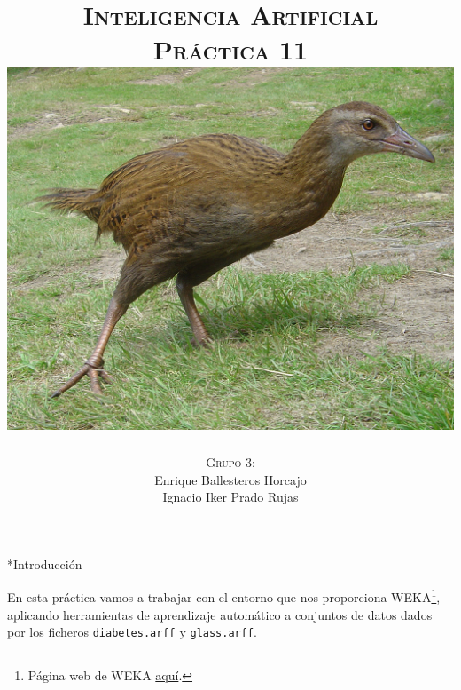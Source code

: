 \documentclass[11pt, a4paper, spanish, openright, twoside]{book}
\begin{document}
 
\title{\Huge{\textsc{Inteligencia Artificial}} \\
	\vspace{0.7cm}
	 \textsc{\Large{Práctica 11}} \\
	\vspace{1.5cm}
	\includegraphics[scale=0.2]{weka}
	}
\author{\textsc{Grupo 3:}\\
	Enrique Ballesteros Horcajo\\
	Ignacio Iker Prado Rujas}
\date{\Today}
\maketitle

\newpage
\mbox{}
\thispagestyle{empty}						%
\newpage


\tableofcontents 							%

\newpage
\mbox{}
\thispagestyle{empty}						%
\newpage


\vspace{3cm}


\newpage

\begin{section}*{Introducción}
	
	En esta práctica vamos a trabajar con el entorno que nos proporciona WEKA\footnote{Página web de WEKA \href{http://www.cs.waikato.ac.nz/ml/weka/}{aquí}.}, aplicando herramientas de aprendizaje automático a conjuntos de datos dados por los ficheros \texttt{diabetes.arff} y \texttt{glass.arff}.
	
\end{section}
\end{document}
